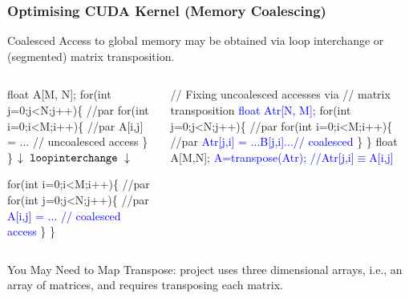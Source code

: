 \documentclass{beamer}
\newcommand{\blue}[1]{\textcolor{Blue}{{#1}}}
\newcommand{\emp}[1]{\textcolor{DikuRed}{ #1}}
\newcommand{\emphh}[1]{\textcolor{CosGreen}{ #1}}
\newcommand{\mymath}[1]{$ #1 $}
\begin{document}
\begin{frame}[fragile,t]
  \frametitle{Optimising CUDA Kernel (Memory Coalescing)} %

Coalesced Access to global memory may be obtained via
        loop interchange or (segmented) matrix transposition. 
\bigskip

\begin{columns}
\begin{colorcode}
\emp{float A[M, N];}
\emphh{for(int j=0;j<N;j++)\{ //par}
  \emphh{for(int i=0;i<M;i++)\{ //par}
    \emp{A[i,j] = ... // uncoalesced access} 
\} \}  \mymath{\downarrow \ {\tt loop interchange} \ \downarrow}

\emphh{for(int i=0;i<M;i++)\{ //par}
  \emphh{for(int j=0;j<N;j++)\{ //par}
    \blue{A[i,j] = ... // coalesced access} 
\} \}
\end{colorcode}
\begin{colorcode}
// Fixing uncoalesced accesses via 
// matrix transposition
\blue{float Atr[N, M];}
\emphh{for(int j=0;j<N;j++)\{ //par}
  \emphh{for(int i=0;i<M;i++)\{ //par}
    \blue{Atr[j,i] = ...B[j,i]...// coalesced} 
\} \}
float A[M,N];
\blue{A=transpose(Atr); //Atr[j,i]\mymath{\equiv}A[i,j]}
\end{colorcode}
\end{columns}
\bigskip

\emp{You May Need to Map Transpose:} 
project uses three dimensional arrays,
i.e., an array of matrices, and requires transposing
each matrix. %

\end{frame}
\end{document}
